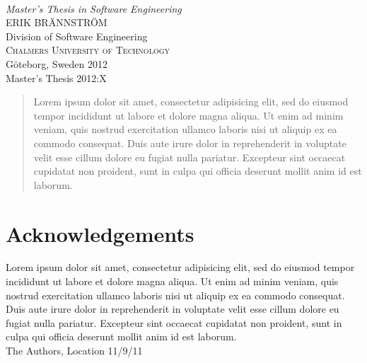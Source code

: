 \begin{titlepage}

\mbox{}
\vfill
\addtolength{\voffset}{2cm}
\begin{flushleft}
	{ \\[0.5cm]
	\emph{\Large Master's Thesis in Software Engineering} \\[.8cm]

	{\huge ERIK BRÄNNSTRÖM}\\[.8cm]

	{\Large Division of Software Engineering \\
	\textsc{Chalmers University of Technology} \\
	Göteborg, Sweden 2012 \\
	Master's Thesis 2012:X\\
	}
	}
\end{flushleft}

\end{titlepage}
\ClearShipoutPicture

\pagestyle{empty}
\newpage
\clearpage
\mbox{}
\newpage
\clearpage
\thispagestyle{empty}

\onecolumn
\begin{abstract}
Lorem ipsum dolor sit amet, consectetur adipisicing elit, sed do eiusmod tempor incididunt ut labore et dolore magna aliqua. Ut enim ad minim veniam, quis nostrud exercitation ullamco laboris nisi ut aliquip ex ea commodo consequat. Duis aute irure dolor in reprehenderit in voluptate velit esse cillum dolore eu fugiat nulla pariatur. Excepteur sint occaecat cupidatat non proident, sunt in culpa qui officia deserunt mollit anim id est laborum.
\end{abstract}

\newpage
\clearpage
\mbox{}
\newpage
\clearpage
\thispagestyle{empty}
\section*{Acknowledgements}
Lorem ipsum dolor sit amet, consectetur adipisicing elit, sed do eiusmod tempor incididunt ut labore et dolore magna aliqua. Ut enim ad minim veniam, quis nostrud exercitation ullamco laboris nisi ut aliquip ex ea commodo consequat. Duis aute irure dolor in reprehenderit in voluptate velit esse cillum dolore eu fugiat nulla pariatur. Excepteur sint occaecat cupidatat non proident, sunt in culpa qui officia deserunt mollit anim id est laborum. \\[1cm]

\hfill The Authors, Location 11/9/11
\newpage
\clearpage
\mbox{}